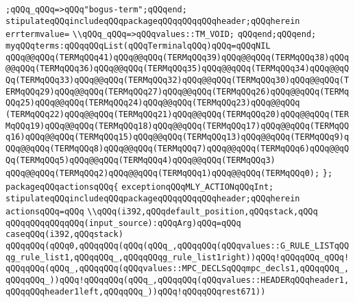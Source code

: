 \verb|;qQQq_qQQq=>qQQq"bogus-term";qQQqend;|\newline
\verb|stipulateqQQqincludeqQQqpackageqQQqqQQqqQQqheader;qQQqherein|\newline
\verb|errtermvalue=|\newline
\verb|\\qQQq_qQQq=>qQQqvalues::TM_VOID;|\newline
\verb|qQQqend;qQQqend;|\newline
\verb|myqQQqterms:qQQqqQQqList(qQQqTerminalqQQq)qQQq=qQQqNIL|\newline
\verb|qQQq@@qQQq(TERMqQQq41)qQQq@@qQQq(TERMqQQq39)qQQq@@qQQq(TERMqQQq38)qQQq@@qQQq(TERMqQQq36)qQQq@@qQQq(TERMqQQq35)qQQq@@qQQq(TERMqQQq34)qQQq@@qQQq(TERMqQQq33)qQQq@@qQQq(TERMqQQq32)qQQq@@qQQq(TERMqQQq30)qQQq@@qQQq(TERMqQQq29)qQQq@@qQQq(TERMqQQq27)qQQq@@qQQq(TERMqQQq26)qQQq@@qQQq(TERMqQQq25)qQQq@@qQQq(TERMqQQq24)qQQq@@qQQq(TERMqQQq23)qQQq@@qQQq|\newline
\verb|(TERMqQQq22)qQQq@@qQQq(TERMqQQq21)qQQq@@qQQq(TERMqQQq20)qQQq@@qQQq(TERMqQQq19)qQQq@@qQQq(TERMqQQq18)qQQq@@qQQq(TERMqQQq17)qQQq@@qQQq(TERMqQQq16)qQQq@@qQQq(TERMqQQq15)qQQq@@qQQq(TERMqQQq13)qQQq@@qQQq(TERMqQQq9)qQQq@@qQQq(TERMqQQq8)qQQq@@qQQq(TERMqQQq7)qQQq@@qQQq(TERMqQQq6)qQQq@@qQQq(TERMqQQq5)qQQq@@qQQq(TERMqQQq4)qQQq@@qQQq(TERMqQQq3)|\newline
\verb|qQQq@@qQQq(TERMqQQq2)qQQq@@qQQq(TERMqQQq1)qQQq@@qQQq(TERMqQQq0);|\newline
\verb|};|\newline
\verb|packageqQQqactionsqQQq{|\newline
\verb|exceptionqQQqMLY_ACTIONqQQqInt;|\newline
\verb|stipulateqQQqincludeqQQqpackageqQQqqQQqqQQqheader;qQQqherein|\newline
\verb|actionsqQQq=qQQq|\newline
\verb|\\qQQq(i392,qQQqdefault_position,qQQqstack,qQQq|\newline
\verb|qQQqqQQqqQQqqQQq(input_source):qQQqArg)qQQq=qQQq|\newline
\verb|caseqQQq(i392,qQQqstack)|\newline
\verb|qQQqqQQq(qQQq0,qQQqqQQq(qQQq(qQQq_,qQQqqQQq(qQQqvalues::G_RULE_LISTqQQqg_rule_list1,qQQqqQQq_,qQQqqQQqg_rule_list1right))qQQq!qQQqqQQq_qQQq!qQQqqQQq(qQQq_,qQQqqQQq(qQQqvalues::MPC_DECLSqQQqmpc_decls1,qQQqqQQq_,qQQqqQQq_))qQQq!qQQqqQQq(qQQq_,qQQqqQQq(qQQqvalues::HEADERqQQqheader1,qQQqqQQqheader1left,qQQqqQQq_))qQQq!qQQqqQQqrest671))|\newline
